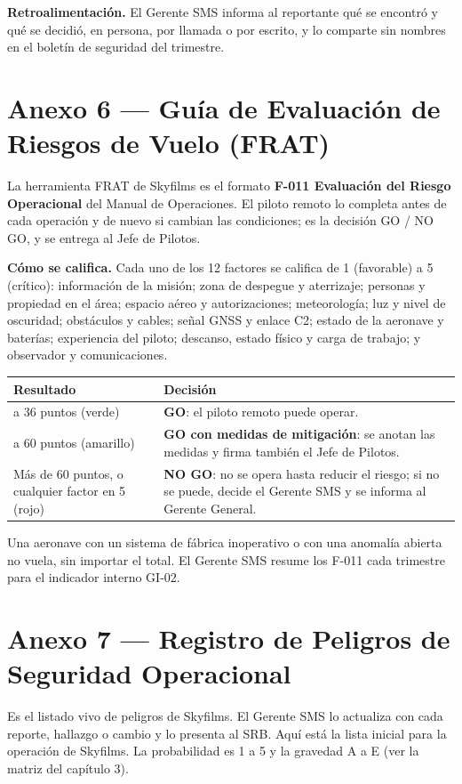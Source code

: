 \textbf{Retroalimentación.} El Gerente SMS informa al reportante qué se encontró y qué se decidió, en persona, por llamada o por escrito, y lo comparte sin nombres en el boletín de seguridad del trimestre.

\clearpage
\section*{Anexo 6 --- Guía de Evaluación de Riesgos de Vuelo (FRAT)}
La herramienta FRAT de Skyfilms es el formato \textbf{F-011 Evaluación del Riesgo Operacional} del Manual de Operaciones. El piloto remoto lo completa antes de cada operación y de nuevo si cambian las condiciones; es la decisión GO / NO GO, y se entrega al Jefe de Pilotos.

\textbf{Cómo se califica.} Cada uno de los 12 factores se califica de 1 (favorable) a 5 (crítico): información de la misión; zona de despegue y aterrizaje; personas y propiedad en el área; espacio aéreo y autorizaciones; meteorología; luz y nivel de oscuridad; obstáculos y cables; señal GNSS y enlace C2; estado de la aeronave y baterías; experiencia del piloto; descanso, estado físico y carga de trabajo; y observador y comunicaciones.

\begin{tabularx}{\textwidth}{|>{\RaggedRight\arraybackslash}p{4.6cm}|X|}
\hline
\rowcolor[gray]{0.9}\textbf{Resultado} & \textbf{Decisión} \\ \hline
12 a 36 puntos (verde) & \textbf{GO}: el piloto remoto puede operar. \\ \hline
37 a 60 puntos (amarillo) & \textbf{GO con medidas de mitigación}: se anotan las medidas y firma también el Jefe de Pilotos. \\ \hline
Más de 60 puntos, o cualquier factor en 5 (rojo) & \textbf{NO GO}: no se opera hasta reducir el riesgo; si no se puede, decide el Gerente SMS y se informa al Gerente General. \\ \hline
\end{tabularx}

\medskip
Una aeronave con un sistema de fábrica inoperativo o con una anomalía abierta no vuela, sin importar el total. El Gerente SMS resume los F-011 cada trimestre para el indicador interno GI-02.

\clearpage
\section*{Anexo 7 --- Registro de Peligros de Seguridad Operacional}
Es el listado vivo de peligros de Skyfilms. El Gerente SMS lo actualiza con cada reporte, hallazgo o cambio y lo presenta al SRB. Aquí está la lista inicial para la operación de Skyfilms. La probabilidad es 1 a 5 y la gravedad A a E (ver la matriz del capítulo 3).

